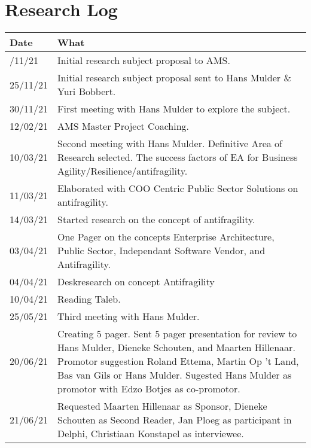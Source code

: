 \appendix
\chapter{Research Log}
\label{app:researchlog}


\begin{longtable}{p{}p{}}
			\toprule
			\textbf{Date} & \textbf{What} \\ \midrule%
			\endhead%
			\hline
			\endfoot%
			24/11/21 & Initial research subject proposal to AMS.\\%
			25/11/21 & Initial research subject proposal sent to Hans Mulder \& Yuri Bobbert.\\%
			30/11/21 & First meeting with Hans Mulder to explore the subject.\\%
			12/02/21 & AMS Master Project Coaching.\\%
			10/03/21 & Second meeting with Hans Mulder. Definitive Area of Research selected. The success factors of EA for Business Agility/Resilience/antifragility.\\%
			11/03/21 & Elaborated with COO Centric Public Sector Solutions on antifragility.\\%
			14/03/21 & Started research on the concept of antifragility.\\%
			03/04/21 & One Pager on the concepts Enterprise Architecture, Public Sector, Independant Software Vendor, and Antifragility.\\%
			04/04/21 & Deskresearch on concept Antifragility\\%
			10/04/21 & Reading Taleb.\\%
			25/05/21 & Third meeting with Hans Mulder.\\%
			20/06/21 & Creating 5 pager. Sent 5 pager presentation for review to Hans Mulder, Dieneke Schouten, and Maarten Hillenaar. Promotor suggestion Roland Ettema, Martin Op 't Land, Bas van Gils or Hans Mulder. Sugested Hans Mulder as promotor with Edzo Botjes as co-promotor.\\%
			21/06/21 & Requested Maarten Hillenaar as Sponsor, Dieneke Schouten as Second Reader, Jan Ploeg as participant in Delphi, Christiaan Konstapel as interviewee.\\%

\end{longtable}
